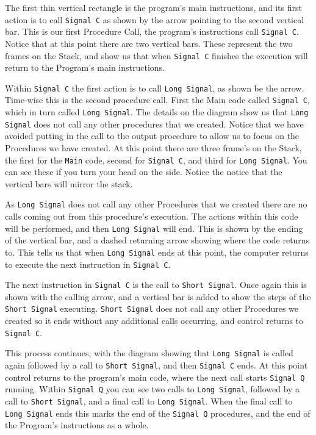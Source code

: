The first thin vertical rectangle is the program's main instructions, and its first action is to call \texttt{Signal C} as shown by the arrow pointing to the second vertical bar. This is our first Procedure Call, the program's instructions call \texttt{Signal C}. Notice that at this point there are two vertical bars. These represent the two frames on the Stack, and show us that when \texttt{Signal C} finishes the execution will return to the Program's main instructions.

Within \texttt{Signal C} the first action is to call \texttt{Long Signal}, as shown be the arrow. Time-wise this is the second procedure call. First the Main code called \texttt{Signal C}, which in turn called \texttt{Long Signal}. The details on the diagram show us that \texttt{Long Signal} does not call any other procedures that we created. Notice that we have avoided putting in the call to the output procedure to allow us to focus on the Procedures we have created. At this point there are three frame's on the Stack, the first for the \texttt{Main} code, second for \texttt{Signal C}, and third for \texttt{Long Signal}. You can see these if you turn your head on the side. Notice the notice that the vertical bars will mirror the stack.

As \texttt{Long Signal} does not call any other Procedures that we created there are no calls coming out from this procedure's execution. The actions within this code will be performed, and then \texttt{Long Signal} will end. This is shown by the ending of the vertical bar, and a dashed returning arrow showing where the code returns to. This tells us that when \texttt{Long Signal} ends at this point, the computer returns to execute the next instruction in \texttt{Signal C}.

The next instruction in \texttt{Signal C} is the call to \texttt{Short Signal}. Once again this is shown with the calling arrow, and a vertical bar is added to show the steps of the \texttt{Short Signal} executing. \texttt{Short Signal} does not call any other Procedures we created so it ends without any additional calls occurring, and control returns to \texttt{Signal C}.

This process continues, with the diagram showing that \texttt{Long Signal} is called again followed by a call to \texttt{Short Signal}, and then \texttt{Signal C} ends. At this point control returns to the program's main code, where the next call starts \texttt{Signal Q} running. Within \texttt{Signal Q} you can see two calls to \texttt{Long Signal}, followed by a call to \texttt{Short Signal}, and a final call to \texttt{Long Signal}. When the final call to \texttt{Long Signal} ends this marks the end of the \texttt{Signal Q} procedures, and the end of the Program's instructions as a whole.

